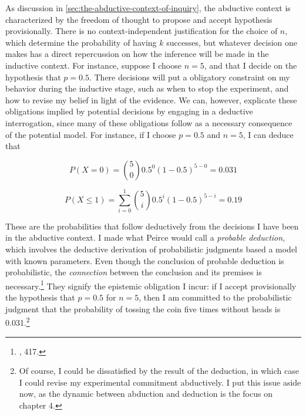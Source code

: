 As discussion in \ref{sec:the-abductive-context-of-inquiry}, the abductive context is characterized by the freedom of thought to propose and accept hypothesis provisionally. There is no context-independent justification for the
choice of \(n\), which determine the probability of having \(k\)
successes, but whatever decision one makes has a direct repercussion on how the inference will be made in the inductive context.  For instance, suppose I choose  \(n=5\), and that I decide on the hypothesis that \(p=0.5\). There decisions will put a obligatory constraint on my behavior during the inductive stage, such as when to stop the experiment, and how to revise my belief in light of the evidence. We can, however, explicate these  obligations implied by potential decisions by engaging in a deductive interrogation, since many of these obligations follow as a necessary consequence of the potential model. For instance, if I choose \(p=0.5\) and \(n=5\), I can deduce that

\[P(X=0) = {5 \choose 0} 0.5^0 (1-0.5)^{5-0} = 0.031\]

\[P(X\leq 1) = \sum_{i=0}^1 {5 \choose i } 0.5^i (1-0.5)^{5-i} = 0.19\]

These are the probabilities that follow deductively from the decisions I
have been in the abductive context. I made what Peirce would call a
\emph{probable deduction}, which involves the deductive derivation of
probabilistic judgments based a model with known parameters. Even though
the conclusion of probable deduction is probabilistic, the
\emph{connection} between the conclusion and its premises is
necessary.\footnote{\cite{probableinference}, 417.}
They signify the epistemic obligation I incur: if I accept
provisionally the hypothesis that \(p=0.5\) for \(n=5\), then I am
committed to the probabilistic judgment that the probability of tossing
the coin five times without heads is 0.031.\footnote{Of course, I could
  be dissatisfied by the result of the deduction, in which case I could
  revise my experimental commitment abductively. I put this issue aside
  now, as the dynamic between abduction and deduction is the focus on
  chapter 4.}



